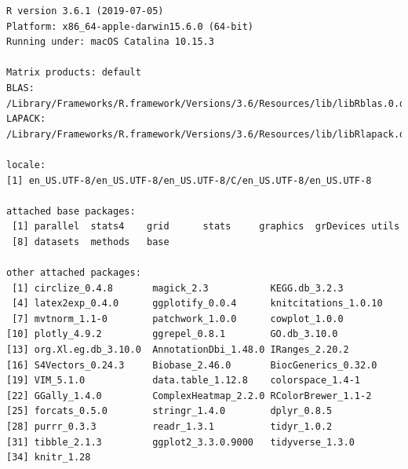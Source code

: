 \documentclass[11pt,]{article}
\begin{document}
\begin{verbatim}
R version 3.6.1 (2019-07-05)
Platform: x86_64-apple-darwin15.6.0 (64-bit)
Running under: macOS Catalina 10.15.3

Matrix products: default
BLAS:   /Library/Frameworks/R.framework/Versions/3.6/Resources/lib/libRblas.0.dylib
LAPACK: /Library/Frameworks/R.framework/Versions/3.6/Resources/lib/libRlapack.dylib

locale:
[1] en_US.UTF-8/en_US.UTF-8/en_US.UTF-8/C/en_US.UTF-8/en_US.UTF-8

attached base packages:
 [1] parallel  stats4    grid      stats     graphics  grDevices utils    
 [8] datasets  methods   base     

other attached packages:
 [1] circlize_0.4.8       magick_2.3           KEGG.db_3.2.3       
 [4] latex2exp_0.4.0      ggplotify_0.0.4      knitcitations_1.0.10
 [7] mvtnorm_1.1-0        patchwork_1.0.0      cowplot_1.0.0       
[10] plotly_4.9.2         ggrepel_0.8.1        GO.db_3.10.0        
[13] org.Xl.eg.db_3.10.0  AnnotationDbi_1.48.0 IRanges_2.20.2      
[16] S4Vectors_0.24.3     Biobase_2.46.0       BiocGenerics_0.32.0 
[19] VIM_5.1.0            data.table_1.12.8    colorspace_1.4-1    
[22] GGally_1.4.0         ComplexHeatmap_2.2.0 RColorBrewer_1.1-2  
[25] forcats_0.5.0        stringr_1.4.0        dplyr_0.8.5         
[28] purrr_0.3.3          readr_1.3.1          tidyr_1.0.2         
[31] tibble_2.1.3         ggplot2_3.3.0.9000   tidyverse_1.3.0     
[34] knitr_1.28          


\end{verbatim}
\end{document}
